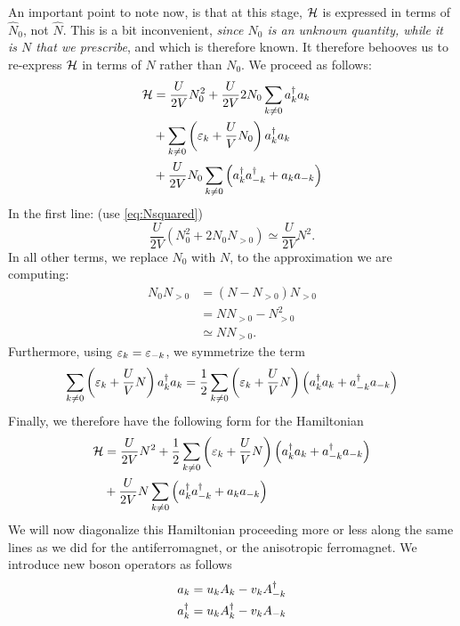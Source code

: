 An important point to note now, is that at this stage, $\mathcal{H}$ is expressed in terms of $\hat{N}_0$, not $\hat{N}$. This is a bit inconvenient, \emph{since $N_0$ is an unknown quantity, while it is $N$ that we prescribe}, and which is therefore known. It therefore behooves us to re-express $\mathcal{H}$ in terms of $N$ rather than $N_0$. We proceed as follows:
\begin{align*}
	\mathcal{H} &= \frac{U}{2V}N_{0}^{2} + \frac{U}{2V}2N_{0}\sum_{k\ne0}a_{k}^{\dagger}a_{k} \\ 
	&+ \sum_{k\ne0}\left (\varepsilon_k + \frac{U}{V}N_0\right )a_{k}^{\dagger}a_{k} \\
	&+  \frac{U}{2V}N_0 \sum_{k\ne0}\left (a_{k}^{\dagger}a_{-k}^{\dagger} + a_{k}a_{-k}\right )
\end{align*}
In the first line: (use \cref{eq:Nsquared})
\begin{equation}
	\frac{U}{2V}(N_0^2 + 2N_0N_{>0}) \simeq \frac{U}{2V}N^2.
\end{equation}
In all other terms, we replace $N_0$ with $N$, to the approximation we are computing: 
\begin{equation}
	\begin{aligned}
		N_0N_{>0} &= (N-N_{>0})N_{>0} \\
		&= NN_{>0} - N_{>0}^2 \\
		&\simeq NN_{>0}.
	\end{aligned}
\end{equation}
Furthermore, using $\varepsilon_k = \varepsilon_{-k}$, we symmetrize the term
\begin{equation}
	\sum_{k\ne0}\left (\varepsilon_k + \frac{U}{V}N\right )a_{k}^{\dagger}a_{k} = \frac{1}{2}\sum_{k\ne0}\left (\varepsilon_k + \frac{U}{V}N\right )\left (a_{k}^{\dagger}a_{k} + a_{-k}^{\dagger}a_{-k}\right )
\end{equation}
Finally, we therefore have the following form for the Hamiltonian
\begin{equation}
	\begin{aligned}
		\mathcal{H} &= \frac{U}{2V}N^2 + \frac{1}{2}\sum_{k\ne0}\left (\varepsilon_k + \frac{U}{V}N\right )\left (a_{k}^{\dagger}a_{k} + a_{-k}^{\dagger}a_{-k}\right ) \\
		&+\frac{U}{2V}N \sum_{k\ne0}\left (a_{k}^{\dagger}a_{-k}^{\dagger} + a_{k}a_{-k}\right )
	\end{aligned}
\end{equation}
We will now diagonalize this Hamiltonian proceeding more or less along the same lines as we did for the antiferromagnet, or the anisotropic ferromagnet. We 
introduce new boson operators as follows
\begin{equation}
	\begin{aligned}
		a_k &= u_kA_k-v_kA_{-k}^{\dagger} \\
		a_k^{\dagger} &= u_kA_k^{\dagger}-v_kA_{-k}
	\end{aligned}
\end{equation}
